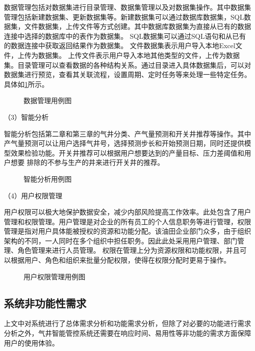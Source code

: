 数据管理包括对数据集进行目录管理、数据集管理以及对数据集操作。其中数据集管理包括新建数据集、更新数据集等。新建数据集可以通过数据库数据集，SQL数据集，文件数据集，上传文件等方式创建。其中数据库数据集为直接从已有的数据连接中选择的数据库中的表作为数据集。
SQL数据集可以通过SQL语句和从已有的数据连接中获取返回结果作为数据集。
文件数据集表示用户导入本地Excel文件，上传为数据集。
上传文件表示用户导入本地其他类型的文件，上传为数据集。目录管理可以查看数据的各种结构关系。通过目录进入具体数据集后，可以对数据集进行预览，查看其关联流程，设置周期、定时任务等来处理一些特定任务。具体如\ref{fig:datamaucase}所示。
\begin{figure}[H]
    \centering
    \caption{数据管理用例图}
    
    \label{fig:datamaucase}
\end{figure}

（3）智能分析

智能分析包括第二章和第三章的气井分类、产气量预测和开关井推荐等操作。其中产气量预测可以让用户选择气井号，选择预测步长和开始预测日期，同时还提供模型效果检验功能。开关井推荐可以根据用户想要达到的产量目标、压力差阈值和用户想要
排除的不参与生产的井来进行开关井的推荐。
\begin{figure}[H]
    \centering
    \caption{智能分析用例图}
    
    \label{fig:analyusecase}
\end{figure}


（4）用户权限管理

用户权限可以极大地保护数据安全，减少内部风险提高工作效率。此处包含了用户管理和权限管理。用户管理是对企业的所有员工的个人信息职务等进行管理，权限管理是指对用户具体能被授权的资源和功能分配。该油田企业部门众多，由于组织架构的不同，一人同时在多个组织中担任职务。因此此处采用用户管理、部门管理、角色管理来进行人员管理。
权限在管理上分为资源权限和功能权限，并且可以根据用户、角色和组织来批量分配权限，使得在权限分配时更易于操作。
\begin{figure}[H]
    \centering
    \caption{用户权限管理用例图}
    
\end{figure}
\subsection{系统非功能性需求}
上文中对系统进行了总体需求分析和功能需求分析，但除了对必要的功能进行需求分析之外，气井智能管控系统还需要在响应时间、易用性等非功能的需求方面保障用户的使用体验。

